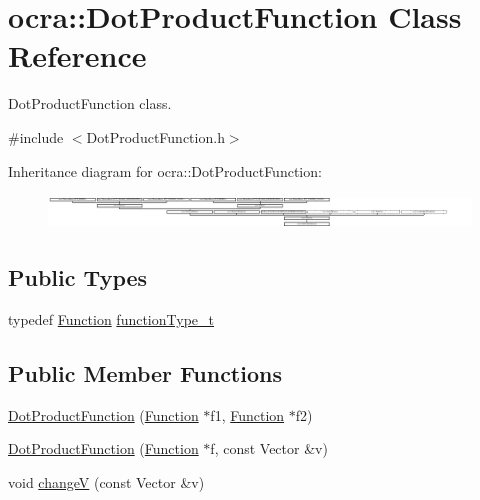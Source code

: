 \hypertarget{classocra_1_1DotProductFunction}{}\section{ocra\+:\+:Dot\+Product\+Function Class Reference}
\label{classocra_1_1DotProductFunction}


Dot\+Product\+Function class.  




{\ttfamily \#include $<$Dot\+Product\+Function.\+h$>$}

Inheritance diagram for ocra\+:\+:Dot\+Product\+Function\+:\begin{figure}[H]
\begin{center}
\leavevmode
\includegraphics[height=0.901771cm]{db/da4/classocra_1_1DotProductFunction}
\end{center}
\end{figure}
\subsection*{Public Types}
\begin{DoxyCompactItemize}
\item 
typedef \hyperlink{classocra_1_1Function}{Function} \hyperlink{classocra_1_1DotProductFunction_abdc60b6380ffedc075792224bd908c48}{function\+Type\+\_\+t}
\end{DoxyCompactItemize}
\subsection*{Public Member Functions}
\begin{DoxyCompactItemize}
\item 
\hyperlink{classocra_1_1DotProductFunction_a70f7d2b9c9fefba0203fbee84607c9e9}{Dot\+Product\+Function} (\hyperlink{classocra_1_1Function}{Function} $\ast$f1, \hyperlink{classocra_1_1Function}{Function} $\ast$f2)
\item 
\hyperlink{classocra_1_1DotProductFunction_a369a245fec0cfe2d4f72bfd577ab7ad0}{Dot\+Product\+Function} (\hyperlink{classocra_1_1Function}{Function} $\ast$f, const Vector \&v)
\item 
void \hyperlink{classocra_1_1DotProductFunction_a2c7c65e80d7fb5ac1da43421a792f77b}{changeV} (const Vector \&v)
\end{DoxyCompactItemize}
